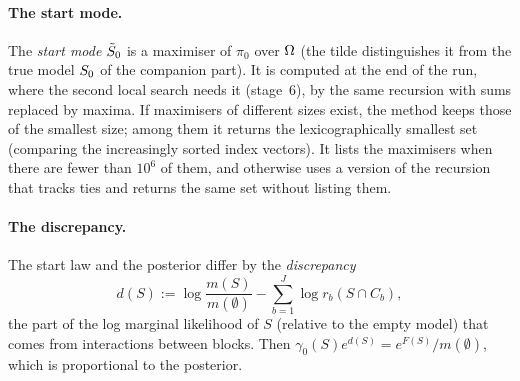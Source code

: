 \documentclass[11pt]{article}
\begin{document}
\paragraph{The start mode.} The \emph{start mode} $\tilde S_0$ is a maximiser of $\pi_0$ over $\Omega$ (the tilde distinguishes it
from the true model $S_0$ of the companion part). It is computed at the end of the run, where the second local search
needs it (stage~6), by the same recursion with sums replaced by maxima. If maximisers of different sizes exist, the
method keeps those of the smallest size; among them it returns the lexicographically smallest set (comparing the
increasingly sorted index vectors). It lists the maximisers when there are fewer than $10^6$ of them, and otherwise uses a
version of the recursion that tracks ties and returns the same set without listing them.

\paragraph{The discrepancy.} The start law and the posterior differ by the \emph{discrepancy}
\begin{equation}\label{eq:m-discrepancy}
  d(S):=\log\frac{m(S)}{m(\emptyset)}-\sum_{b=1}^J\log r_b(S\cap C_b),
\end{equation}
the part of the log marginal likelihood of $S$ (relative to the empty model) that comes from interactions between
blocks. Then $\gamma_0(S)e^{d(S)}=e^{F(S)}/m(\emptyset)$,
which is proportional to the posterior.
\end{document}
